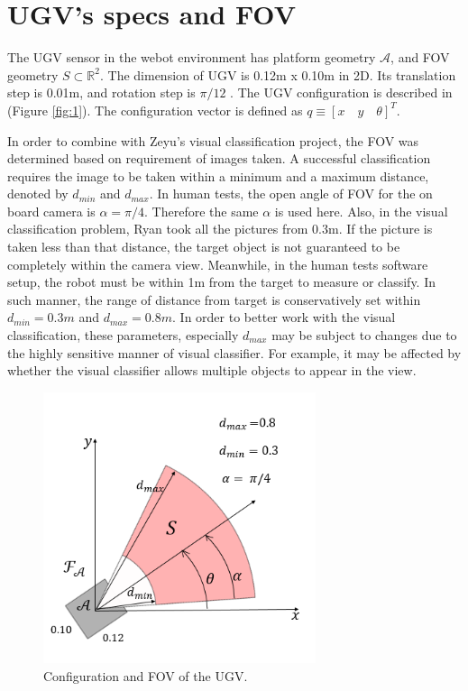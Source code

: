 \documentclass[12pt,draftcls,onecolumn]{IEEEtran}
\begin{document}
\section{UGV's specs and FOV} 


The UGV sensor in the webot environment has platform geometry $\mathcal{A}$, and FOV geometry $S \subset \mathbb{R}^2 $. 
The dimension of UGV is 0.12m x 0.10m in 2D.
Its translation step is 0.01m, and rotation step is $\pi/12$ .
The UGV configuration is described in  (Figure \ref{fig:1}).
The configuration vector is defined as $q \equiv [x  \quad  y  \quad  \theta]^T$.



In order to combine with Zeyu's visual classification project, the FOV was determined based on requirement of  images taken. 
A successful classification requires the image to be taken within a minimum and a maximum distance, denoted by $d_{min}$ and  $d_{max}$. 
In human tests, the open angle of FOV for the on board camera is $\alpha =\pi/4 $. 
Therefore the same  $\alpha$ is used here.
Also, in the visual classification problem, Ryan took all the pictures from 0.3m.
If the picture is taken less than that distance, the target object is not guaranteed to be completely within the camera view.
Meanwhile, in the human tests software setup, the robot must be within 1m from the target to  measure or classify.
In such manner, the range of distance from target is conservatively set within $d_{min} = 0.3m$ and  $d_{max}=0.8 m$.
In order to better work with the visual classification, these parameters, especially $d_{max}$ may be subject to changes due to the highly sensitive manner of visual classifier. 
For example, it may be affected by whether the visual classifier allows multiple objects to appear in the view. 

\begin{figure}
 \centering
  \includegraphics[width=8cm]{figures/FOV}
  \caption{Configuration and FOV of the UGV.}
  \label{fig:3}
\end{figure}
\end{document}
